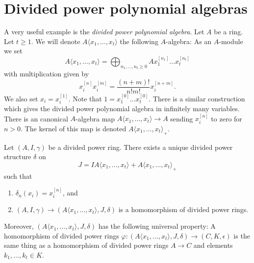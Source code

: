\section{Divided power polynomial algebras}
\label{section-divided-power-polynomial-ring}

\noindent
A very useful example is the {\it divided power polynomial algebra}.
Let $A$ be a ring. Let $t \geq 1$. We will denote
$A\langle x_1, \ldots, x_t \rangle$ the following $A$-algebra:
As an $A$-module we set
$$
A\langle x_1, \ldots, x_t \rangle =
\bigoplus\nolimits_{n_1, \ldots, n_t \geq 0} A x_1^{[n_1]} \ldots x_t^{[n_t]}
$$
with multiplication given by
$$
x_i^{[n]}x_i^{[m]} = \frac{(n + m)!}{n!m!}x_i^{[n + m]}.
$$
We also set $x_i = x_i^{[1]}$. Note that
$1 = x_1^{[0]} \ldots x_t^{[0]}$. There is a similar construction
which gives the divided power polynomial algebra in infinitely many
variables. There is an canonical $A$-algebra map
$A\langle x_1, \ldots, x_t \rangle \to A$ sending $x_i^{[n]}$ to zero
for $n > 0$. The kernel of this map is denoted
$A\langle x_1, \ldots, x_t \rangle_{+}$.

\begin{lemma}
\label{lemma-divided-power-polynomial-algebra}
Let $(A, I, \gamma)$ be a divided power ring.
There exists a unique divided power structure $\delta$ on
$$
J = IA\langle x_1, \ldots, x_t \rangle + A\langle x_1, \ldots, x_t \rangle_{+}
$$
such that
\begin{enumerate}
\item $\delta_n(x_i) = x_i^{[n]}$, and
\item $(A, I, \gamma) \to (A\langle x_1, \ldots, x_t \rangle, J, \delta)$
is a homomorphism of divided power rings.
\end{enumerate}
Moreover, $(A\langle x_1, \ldots, x_t \rangle, J, \delta)$ has the
following universal property: A homomorphism of divided power rings
$\varphi : (A\langle x_1, \ldots, x_t \rangle, J, \delta) \to
(C, K, \epsilon)$ is
the same thing as a homomorphism of divided power rings
$A \to C$ and elements $k_1, \ldots, k_t \in K$.
\end{lemma}

